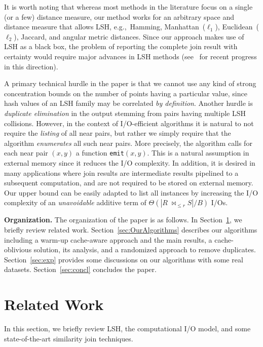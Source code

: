 \documentclass{llncs}
\newcommand{\BT}[1]{{\Theta}\left(#1\right)}
\begin{document}
\smallskip

It is worth noting that whereas most methods in the literature focus on a single (or a few) distance measure, our method works for an arbitrary space and distance measure that allows LSH, e.g.,~Hamming, Manhattan~($\ell_1$), Euclidean~($\ell_2$), Jaccard, and angular metric distances. 
Since our approach makes use of LSH as a black box, the problem of reporting the complete join result with certainty would require major advances in LSH methods (see~\cite{Pacuk_COCOON16,Pagh_SODA16} for recent progress in this direction).

A primary technical hurdle in the paper is that we cannot use any kind of strong concentration bounds on the number of points having a particular value, since hash values of an LSH family may be correlated \emph{by definition}. 
Another hurdle is \emph{duplicate elimination} in the output stemming from pairs having multiple LSH collisions. 
However, in the context of I/O-efficient algorithms it is natural to not require the {\em listing\/} of all near pairs, but rather we simply require that the algorithm {\em enumerates\/} all such near pairs.
More precisely, the algorithm calls for each near pair $(x,y)$ a function \texttt{emit}$(x,y)$. 
This is a natural assumption in external memory since it reduces the I/O complexity. 
In addition, it is desired in many applications where join results are intermediate results pipelined to a subsequent computation, and are not required to be stored on external memory.
Our upper bound can be easily adapted to list all instances by increasing the I/O complexity of an \textit{unavoidable} additive term of $\BT{|R \; \bowtie_{\leq r} S|/B}$ I/Os.


\smallskip

\textbf{Organization.}
The organization of the paper is as follows. 
In Section~\ref{sec:RelatedWork}, we briefly review related work. 
Section~\ref{sec:OurAlgorithms} describes our algorithms including a warm-up cache-aware approach and the main results, a cache-oblivious solution, its analysis, and a randomized approach to remove duplicates. 
Section~\ref{sec:exp} provides some discussions on our
algorithms with some real datasets.
Section~\ref{sec:concl} concludes the paper.

\section{Related Work}\label{sec:RelatedWork}

In this section, we briefly review LSH, the computational I/O model, and some
state-of-the-art similarity join techniques.
\end{document}
